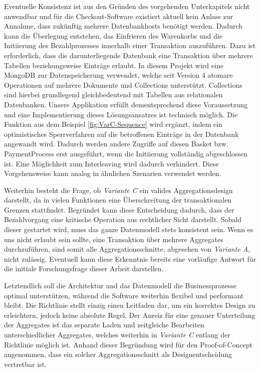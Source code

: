 Eventuelle Konsistenz ist aus den Gründen des vorgehenden Unterkapitels nicht anwendbar und für die Checkout-Software existiert aktuell kein Anlass zur Annahme, dass zukünftig mehrere Datenbankhosts benötigt werden. Dadurch kann die Überlegung entstehen, das Einfrieren des Warenkorbs und die Initiierung des Bezahlprozesses innerhalb einer Transaktion auszuführen. Dazu ist erforderlich, dass die darunterliegende Datenbank eine Transaktion über mehrere Tabellen beziehungsweise Einträge erlaubt. In diesem Projekt wird eine MongoDB zur Datenspeicherung verwendet, welche seit Version 4 atomare Operationen auf mehrere Dokumente und Collections unterstützt. Collections sind hierbei grundlegend gleichbedeutend mit Tabellen aus relationalen Datenbanken. Unsere Applikation erfüllt dementsprechend diese Voraussetzung und eine Implementierung dieses Lösungsansatzes ist technisch möglich. Die Funktion aus dem Beispiel \ref{fig:VarC-Sequence} wird ergänzt, indem ein optimistisches Sperrverfahren auf die betroffenen Einträge in der Datenbank angewandt wird. Dadurch werden andere Zugriffe auf diesen Basket bzw. PaymentProcess erst ausgeführt, wenn die Initiierung vollständig abgeschlossen ist. Eine Möglichkeit zum Interleaving wird dadurch verhindert. Diese Vorgehensweise kann analog in ähnlichen Szenarien verwendet werden.

Weiterhin besteht die Frage, ob \emph{Variante C} ein valides Aggregationsdesign darstellt, da in vielen Funktionen eine Überschreitung der transaktionalen Grenzen stattfindet. Begründet kann diese Entscheidung dadurch, dass der Bezahlvorgang eine kritische Operation aus rechtlicher Sicht darstellt. Sobald dieser gestartet wird, muss das ganze Datenmodell stets konsistent sein. Wenn es uns nicht erlaubt sein sollte, eine Transaktion über mehrere Aggregates durchzuführen, sind somit alle Aggregationsschnitte, abgesehen von \emph{Variante A}, nicht zulässig. Eventuell kann diese Erkenntnis bereits eine vorläufige Antwort für die initiale Forschungsfrage dieser Arbeit darstellen.

Letztendlich soll die Architektur und das Datenmodell die Businessprozesse optimal unterstützen, während die Software weiterhin flexibel und performant bleibt. Die Richtlinie stellt einzig einen Leitfaden dar, um ein korrektes Design zu erleichtern, jedoch keine absolute Regel. Der Anreiz für eine genauer Unterteilung der Aggregates ist das separate Laden und zeitgleiche Bearbeiten unterschiedlicher Aggregates, welches weiterhin in \emph{Variante C} entlang der Richtlinie möglich ist. Anhand dieser Begründung wird für den Proof-of-Concept angenommen, dass ein solcher Aggregationsschnitt als Designentscheidung vertretbar ist.

